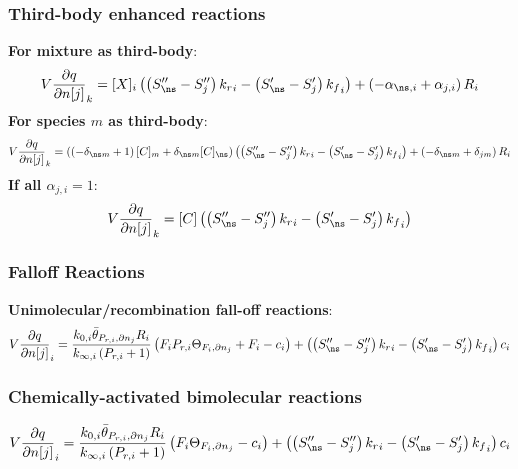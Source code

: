 \documentclass[a4paper,10pt]{article}
\begin{document}
\subsubsection{Third-body enhanced reactions}
\textbf{For mixture as third-body}:
\begin{dmath} V \frac{\partial q }{\partial n[j] }_{k} = [X]_{i} \left(\left(S^{\prime\prime}_{\ns} - S^{\prime\prime}_{j}\right) {k_r}_{i} - \left(S^{\prime}_{\ns} - S^{\prime}_{j}\right) {k_f}_{i}\right) + \left(- \alpha_{\ns,i} + \alpha_{j,i}\right) R_{i}\end{dmath} 
\textbf{For species $m$ as third-body}:
\begin{dmath} V \frac{\partial q }{\partial n[j] }_{k} = \left(\left(- \delta_{\ns m} + 1\right) [C]_{m} + \delta_{\ns m} [C]_{\ns}\right) \left(\left(S^{\prime\prime}_{\ns} - S^{\prime\prime}_{j}\right) {k_r}_{i} - \left(S^{\prime}_{\ns} - S^{\prime}_{j}\right) {k_f}_{i}\right) + \left(- \delta_{\ns m} + \delta_{j m}\right) R_{i}\end{dmath} 
\textbf{If all $\alpha_{j,i} = 1$}:
\begin{dmath} V \frac{\partial q }{\partial n[j] }_{k} = [C] \left(\left(S^{\prime\prime}_{\ns} - S^{\prime\prime}_{j}\right) {k_r}_{i} - \left(S^{\prime}_{\ns} - S^{\prime}_{j}\right) {k_f}_{i}\right)\end{dmath} 
\subsubsection{Falloff Reactions}
\textbf{Unimolecular\slash recombination fall-off reactions}:
\begin{dmath} V \frac{\partial q }{\partial n[j] }_{i} = \frac{k_{0, i} \bar{\theta}_{P_{r, i}, \partial n_j} R_{i}}{k_{\infty, i} \left(P_{r, i} + 1\right)} \left(F_{i} P_{r, i} \Theta_{F_i, \partial n_j} + F_{i} - c_{i}\right) + \left(\left(S^{\prime\prime}_{\ns} - S^{\prime\prime}_{j}\right) {k_r}_{i} - \left(S^{\prime}_{\ns} - S^{\prime}_{j}\right) {k_f}_{i}\right) c_{i}\end{dmath} 
\subsubsection{Chemically-activated bimolecular reactions}
\begin{dmath} V \frac{\partial q }{\partial n[j] }_{i} = \frac{k_{0, i} \bar{\theta}_{P_{r, i}, \partial n_j} R_{i}}{k_{\infty, i} \left(P_{r, i} + 1\right)} \left(F_{i} \Theta_{F_i, \partial n_j} - c_{i}\right) + \left(\left(S^{\prime\prime}_{\ns} - S^{\prime\prime}_{j}\right) {k_r}_{i} - \left(S^{\prime}_{\ns} - S^{\prime}_{j}\right) {k_f}_{i}\right) c_{i}\end{dmath} 
\end{document}
